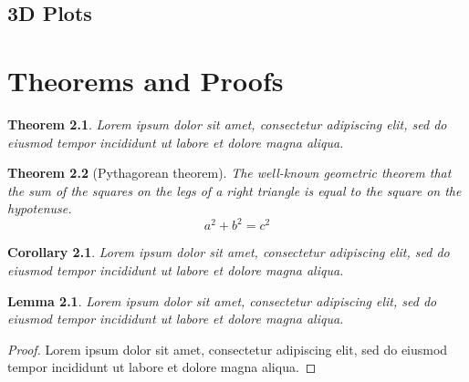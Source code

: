 \documentclass[a4paper, 12pt]{report}
\newtheorem{theorem}{Theorem}
\newtheorem{corollary}{Corollary}
\newtheorem{lemma}{Lemma}
\begin{document}
\section{3D Plots}




\chapter{Theorems and Proofs}
\begin{theorem}
Lorem ipsum dolor sit amet, consectetur adipiscing elit, sed do eiusmod tempor incididunt ut labore et dolore magna aliqua.
\end{theorem}

\begin{theorem}[Pythagorean theorem]
The well-known geometric theorem that the sum of the squares on the legs of a right triangle is equal to the square on the hypotenuse.
\[a^2+b^2=c^2\]
\end{theorem}

\begin{corollary}
Lorem ipsum dolor sit amet, consectetur adipiscing elit, sed do eiusmod tempor incididunt ut labore et dolore magna aliqua.
\end{corollary}

\begin{lemma}
Lorem ipsum dolor sit amet, consectetur adipiscing elit, sed do eiusmod tempor incididunt ut labore et dolore magna aliqua.
\end{lemma}

\begin{proof}
Lorem ipsum dolor sit amet, consectetur adipiscing elit, sed do eiusmod tempor incididunt ut labore et dolore magna aliqua.
\end{proof}
\end{document}

